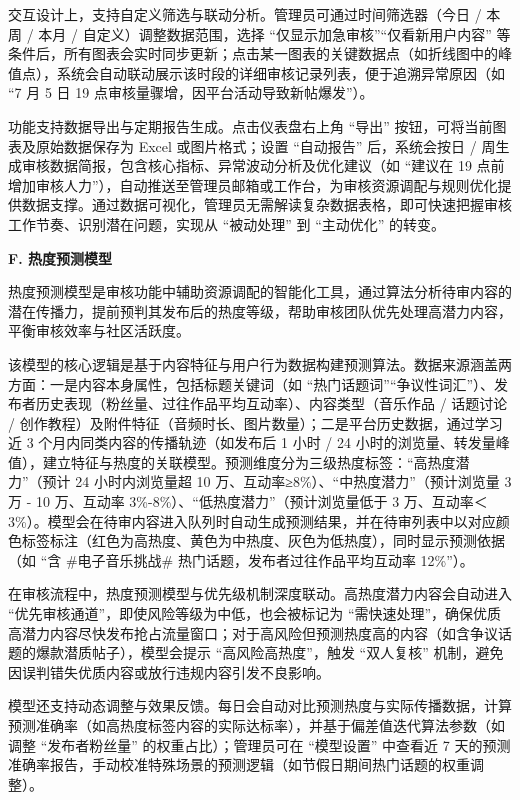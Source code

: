 \documentclass{base}
\numberwithin{figure}{section} %
\begin{document}
交互设计上，支持自定义筛选与联动分析。管理员可通过时间筛选器（今日 / 本周 / 本月 / 自定义）调整数据范围，选择 “仅显示加急审核”“仅看新用户内容” 等条件后，所有图表会实时同步更新；点击某一图表的关键数据点（如折线图中的峰值点），系统会自动联动展示该时段的详细审核记录列表，便于追溯异常原因（如 “7 月 5 日 19 点审核量骤增，因平台活动导致新帖爆发”）。​

功能支持数据导出与定期报告生成。点击仪表盘右上角 “导出” 按钮，可将当前图表及原始数据保存为 Excel 或图片格式；设置 “自动报告” 后，系统会按日 / 周生成审核数据简报，包含核心指标、异常波动分析及优化建议（如 “建议在 19 点前增加审核人力”），自动推送至管理员邮箱或工作台，为审核资源调配与规则优化提供数据支撑。通过数据可视化，管理员无需解读复杂数据表格，即可快速把握审核工作节奏、识别潜在问题，实现从 “被动处理” 到 “主动优化” 的转变。

\textbf{F. 热度预测模型}

热度预测模型是审核功能中辅助资源调配的智能化工具，通过算法分析待审内容的潜在传播力，提前预判其发布后的热度等级，帮助审核团队优先处理高潜力内容，平衡审核效率与社区活跃度。​

该模型的核心逻辑是基于内容特征与用户行为数据构建预测算法。数据来源涵盖两方面：一是内容本身属性，包括标题关键词（如 “热门话题词”“争议性词汇”）、发布者历史表现（粉丝量、过往作品平均互动率）、内容类型（音乐作品 / 话题讨论 / 创作教程）及附件特征（音频时长、图片数量）；二是平台历史数据，通过学习近 3 个月内同类内容的传播轨迹（如发布后 1 小时 / 24 小时的浏览量、转发量峰值），建立特征与热度的关联模型。​
预测维度分为三级热度标签：“高热度潜力”（预计 24 小时内浏览量超 10 万、互动率≥8\%）、“中热度潜力”（预计浏览量 3 万 - 10 万、互动率 3\%-8\%）、“低热度潜力”（预计浏览量低于 3 万、互动率＜3\%）。模型会在待审内容进入队列时自动生成预测结果，并在待审列表中以对应颜色标签标注（红色为高热度、黄色为中热度、灰色为低热度），同时显示预测依据（如 “含 \#电子音乐挑战\# 热门话题，发布者过往作品平均互动率 12\%”）。​

在审核流程中，热度预测模型与优先级机制深度联动。高热度潜力内容会自动进入 “优先审核通道”，即使风险等级为中低，也会被标记为 “需快速处理”，确保优质高潜力内容尽快发布抢占流量窗口；对于高风险但预测热度高的内容（如含争议话题的爆款潜质帖子），模型会提示 “高风险高热度”，触发 “双人复核” 机制，避免因误判错失优质内容或放行违规内容引发不良影响。​

模型还支持动态调整与效果反馈。每日会自动对比预测热度与实际传播数据，计算预测准确率（如高热度标签内容的实际达标率），并基于偏差值迭代算法参数（如调整 “发布者粉丝量” 的权重占比）；管理员可在 “模型设置” 中查看近 7 天的预测准确率报告，手动校准特殊场景的预测逻辑（如节假日期间热门话题的权重调整）。​
\end{document}
